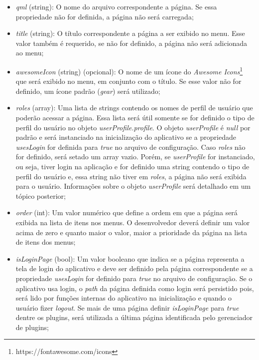 \begin{itemize}
	\item \textit{qml} (string): O nome do arquivo correspondente a página. Se essa propriedade não for definida, a página não será carregada;

	\item \textit{title} (string): O título correspondente a página a ser exibido no menu. Esse valor também é requerido, se não for definido, a página não será adicionada ao menu;

	\item \textit{awesomeIcon} (string) (opcional): O nome de um ícone do \textit{Awesome Icons}\footnote{https://fontawesome.com/icons} que será exibido no menu, em conjunto com o título. Se esse valor não for definido, um ícone padrão (\textit{gear}) será utilizado;

	\item \textit{roles} (array): Uma lista de strings contendo os nomes de perfil de usuário que poderão acessar a página. Essa lista será útil somente se for definido o tipo de perfil do usuário no objeto \textit{userProfile.profile}. O objeto \textit{userProfile} é \textit{null} por padrão e será instanciado na inicialização do aplicativo se a propriedade \textit{usesLogin} for definida para \textit{true} no arquivo de configuração. Caso \textit{roles} não for definido, será setado um array vazio. Porém, se \textit{userProfile} for instanciado, ou seja, tiver login na aplicação e for definido uma string contendo o tipo de perfil do usuário e, essa string não tiver em \textit{roles}, a página não será exibida para o usuário. Informações sobre o objeto \textit{userProfile} será detalhado em um tópico posterior;

	\item \textit{order} (int): Um valor numérico que define a ordem em que a página será exibida na lista de itens nos menus. O desenvolvedor deverá definir um valor acima de zero e quanto maior o valor, maior a prioridade da página na lista de itens dos menus;

	\item \textit{isLoginPage} (bool): Um valor booleano que indica se a página representa a tela de login do aplicativo e deve ser definido pela página correspondente se a propriedade \textit{usesLogin} for definido para \textit{true} no arquivo de configuração. Se o aplicativo usa login, o \textit{path} da página definida como login será persistido pois, será lido por funções internas do aplicativo na inicialização e quando o usuário fizer \textit{logout}. Se mais de uma página definir \textit{isLoginPage} para \textit{true} dentre os plugins, será utilizada a última página identificada pelo gerenciador de plugins;


\end{itemize}

